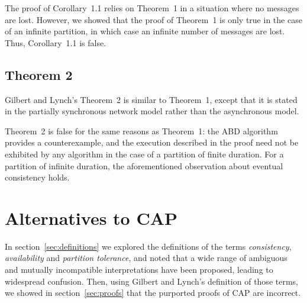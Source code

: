 \documentclass[a4paper,twocolumn,10pt]{article}
\begin{document}
The proof of Corollary~1.1 relies on Theorem~1 in a situation where no messages are lost. However,
we showed that the proof of Theorem~1 is only true in the case of an infinite partition, in which
case an infinite number of messages are lost. Thus, Corollary~1.1 is false.

\subsection{Theorem 2}\label{sec:theorem2}

Gilbert and Lynch's Theorem~2 is similar to Theorem~1, except that it is stated in the partially
synchronous network model rather than the asynchronous model.

Theorem~2 is false for the same reasons as Theorem~1: the ABD algorithm provides a counterexample,
and the execution described in the proof need not be exhibited by any algorithm in the case of a
partition of finite duration. For a partition of infinite duration, the aforementioned observation
about eventual consistency holds.

%
%
%

\section{Alternatives to CAP}\label{sec:alternatives}

In section~\ref{sec:definitions} we explored the definitions of the terms \emph{consistency},
\emph{availability} and \emph{partition tolerance}, and noted that a wide range of ambiguous and
mutually incompatible interpretations have been proposed, leading to widespread confusion. Then,
using Gilbert and Lynch's definition of those terms, we showed in section~\ref{sec:proofs} that the
purported proofs of CAP are incorrect.
\end{document}
